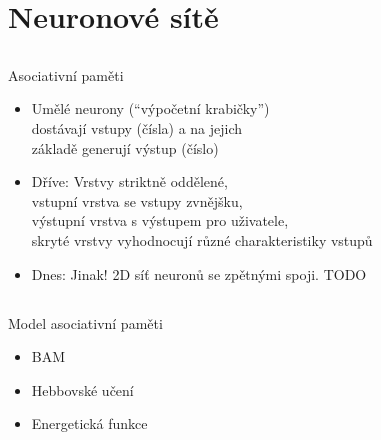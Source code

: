 \documentclass{beamer}
\begin{document}
\section{Neuronové sítě}

\subsection{}
\begin{frame}{Asociativní paměti}
\begin{itemize}
\item Umělé neurony (``výpočetní krabičky'') \\ dostávají vstupy (čísla) a na jejich \\ základě generují výstup (číslo)
\item Dříve: Vrstvy striktně oddělené, \\ vstupní vrstva se vstupy zvnějšku, \\ výstupní vrstva s výstupem pro uživatele, \\ skryté vrstvy vyhodnocují různé charakteristiky vstupů
\item Dnes: Jinak! 2D síť neuronů se zpětnými spoji.
	TODO
\end{itemize}
\end{frame}

\subsection{}
\begin{frame}{Model asociativní paměti}
\begin{itemize}
\item BAM
\item Hebbovské učení
\item Energetická funkce
\end{itemize}
\end{frame}
\end{document}
